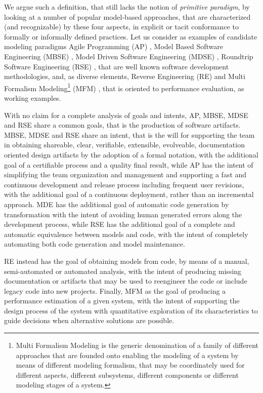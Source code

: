 We argue such a definition, that still lacks the notion of \textit{primitive paradigm}, by looking at a number of popular model-based approaches, that are characterized (and recognizable) by these four aspects, in explicit or tacit conformance to formally or informally defined practices. Let us consider as examples of candidate modeling paradigms Agile Programming (AP) \cite{}, Model Based Software Engineering (MBSE) \cite{}, Model Driven Software Engineering (MDSE) \cite{}, Roundtrip Software Engineering (RSE) \cite{}, that are well known software development methodologies, and, as diverse elements, Reverse Engineering (RE) \cite{} and Multi Formalism Modeling\footnote{Multi Formalism Modeling is the generic denomination of a family of different approaches that are founded onto enabling the modeling of a system by means of different modeling formalism, that may be coordinately used for different aspects, different subsystems, different components or different modeling stages of a system.} (MFM) \cite{MauroChapter}, that is oriented to performance evaluation, as working examples.

With no claim for a complete analysis of goals and intents, AP, MBSE, MDSE and RSE share a common goals, that is the production of software artifacts. MBSE, MDSE and RSE share an intent, that is the will for supporting the team in obtaining shareable, clear, verifiable, extensible, evolveable, documentation oriented design artifacts by the adoption of a formal notation, with the additional goal of a certifiable process and a quality final result, while AP has the intent of simplifying the team organization and management and supporting a fast and continuous development and release process including frequent user revisions, with the additional goal of a continuous deployment, rather than an incremental approach. MDE has the additional goal of automatic code generation by transformation with the intent of avoiding human generated errors along the development process, while RSE has the additional goal of a complete and automatic equivalence between models and code, with the intent of completely automating both code generation and model maintenance.

RE instead has the goal of obtaining models from code, by means of a manual, semi-automated or automated analysis, with the intent of producing missing documentation or artifacts that may be used to reengineer the code or include legacy code into new projects. Finally, MFM as the goal of producing a performance estimation of a given system, with the intent of supporting the design process of the system with quantitative exploration of its characteristics to guide decisions when alternative solutions are possible.

